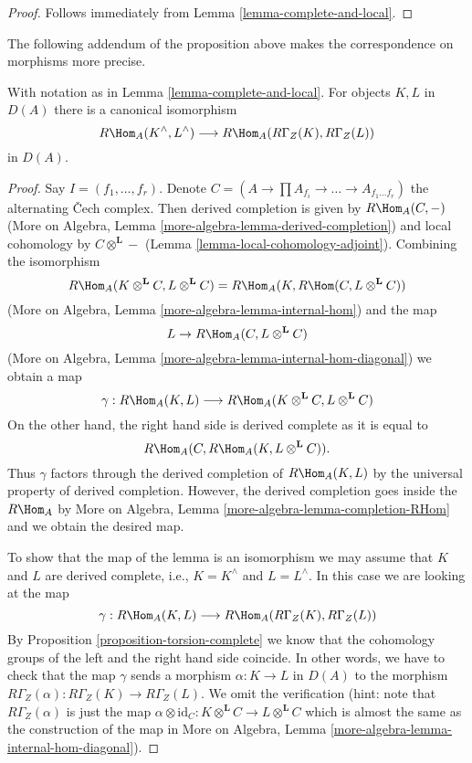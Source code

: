 \begin{proof}
Follows immediately from Lemma \ref{lemma-complete-and-local}.
\end{proof}

\noindent
The following addendum of the proposition above makes the
correspondence on morphisms more precise.

\begin{lemma}
\label{lemma-compare-RHom}
With notation as in Lemma \ref{lemma-complete-and-local}.
For objects $K, L$ in $D(A)$ there is a canonical isomorphism
$$
R\Hom_A(K^\wedge, L^\wedge) \longrightarrow R\Hom_A(R\Gamma_Z(K), R\Gamma_Z(L))
$$
in $D(A)$.
\end{lemma}

\begin{proof}
Say $I = (f_1, \ldots, f_r)$. Denote
$C = (A \to \prod A_{f_i} \to \ldots \to A_{f_1 \ldots f_r})$ the
alternating {\v C}ech complex. Then derived completion is given by
$R\Hom_A(C, -)$ (More on Algebra, Lemma
\ref{more-algebra-lemma-derived-completion}) and local cohomology by
$C \otimes^\mathbf{L} -$ (Lemma \ref{lemma-local-cohomology-adjoint}).
Combining the isomorphism
$$
R\Hom_A(K \otimes^\mathbf{L} C, L \otimes^\mathbf{L} C) =
R\Hom_A(K, R\Hom(C,  L \otimes^\mathbf{L} C))
$$
(More on Algebra, Lemma \ref{more-algebra-lemma-internal-hom})
and the map
$$
L \to R\Hom_A(C,  L \otimes^\mathbf{L} C)
$$
(More on Algebra, Lemma \ref{more-algebra-lemma-internal-hom-diagonal})
we obtain a map
$$
\gamma :
R\Hom_A(K, L)
\longrightarrow
R\Hom_A(K \otimes^\mathbf{L} C, L \otimes^\mathbf{L} C)
$$
On the other hand, the right hand side is derived complete as it is
equal to
$$
R\Hom_A(C, R\Hom_A(K, L \otimes^\mathbf{L} C)).
$$
Thus $\gamma$ factors through the derived completion of
$R\Hom_A(K, L)$ by the universal property of derived completion.
However, the derived completion goes inside the $R\Hom_A$ by
More on Algebra, Lemma \ref{more-algebra-lemma-completion-RHom}
and we obtain the desired map.

\medskip\noindent
To show that the map of the lemma is an isomorphism
we may assume that $K$ and $L$ are derived complete, i.e.,
$K = K^\wedge$ and $L = L^\wedge$. In this case we are
looking at the map
$$
\gamma : R\Hom_A(K, L) \longrightarrow R\Hom_A(R\Gamma_Z(K), R\Gamma_Z(L))
$$
By Proposition \ref{proposition-torsion-complete} we know that
the cohomology groups
of the left and the right hand side coincide. In other words,
we have to check that the map $\gamma$ sends a morphism
$\alpha : K \to L$ in $D(A)$ to the morphism
$R\Gamma_Z(\alpha) : R\Gamma_Z(K) \to R\Gamma_Z(L)$.
We omit the verification (hint: note that $R\Gamma_Z(\alpha)$
is just the map
$\alpha \otimes \text{id}_C :
K \otimes^\mathbf{L} C
\to
L \otimes^\mathbf{L} C$ which is almost the same as the
construction of the map in
More on Algebra, Lemma \ref{more-algebra-lemma-internal-hom-diagonal}).
\end{proof}






